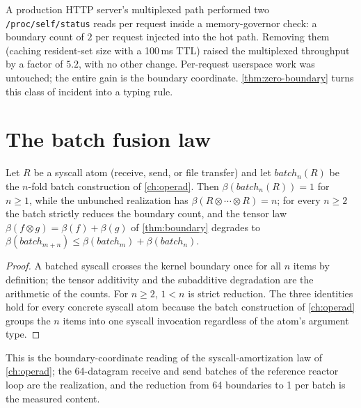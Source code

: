 \begin{remark}
A production HTTP server's multiplexed path performed two
\texttt{/proc/self/status} reads per request inside a memory-governor
check: a boundary count of $2$ per request injected into the hot path.
Removing them (caching resident-set size with a 100\,ms TTL) raised the
multiplexed throughput by a factor of $5.2$, with no other change.
Per-request userspace work was untouched; the entire gain is the
boundary coordinate. \autoref{thm:zero-boundary} turns this class of
incident into a typing rule.
\end{remark}

\section{The batch fusion law}\label{sec:batch-law}

\begin{theorem}\label{thm:batch}
Let $R$ be a syscall atom (receive, send, or file transfer) and let
$\mathit{batch}_n (R)$ be the $n$-fold batch construction of
\autoref{ch:operad}. Then $\beta (\mathit{batch}_n (R)) = 1$ for
$n \geq 1$, while the unbunched realization has
$\beta (R \otimes \cdots \otimes R) = n$; for every $n \geq 2$ the batch
strictly reduces the boundary count, and the tensor law
$\beta (f \otimes g) = \beta (f) + \beta (g)$ of \autoref{thm:boundary}
degrades to
$\beta (\mathit{batch}_{m+n}) \leq \beta (\mathit{batch}_m) +
\beta (\mathit{batch}_n)$.
\end{theorem}

\begin{proof}
A batched syscall crosses the kernel boundary once for all $n$ items by
definition; the tensor additivity and the subadditive degradation are
the arithmetic of the counts. For $n \geq 2$, $1 < n$ is strict
reduction. The three identities hold for every concrete syscall atom
because the batch construction of \autoref{ch:operad} groups the $n$
items into one syscall invocation regardless of the atom's argument
type.
\end{proof}

\begin{remark}
This is the boundary-coordinate reading of the syscall-amortization law
of \autoref{ch:operad}; the 64-datagram receive and send batches of the
reference reactor loop are the realization, and the reduction from 64
boundaries to 1 per batch is the measured content.
\end{remark}

